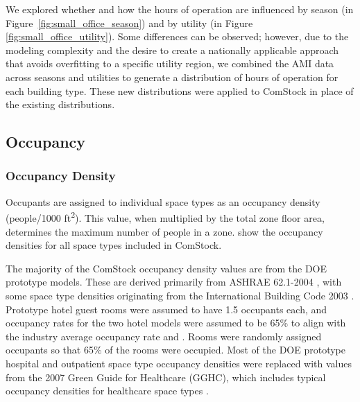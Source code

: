 We explored whether and how the hours of operation are influenced by season (in Figure~\ref{fig:small_office_season}) and by utility (in Figure \ref{fig:small_office_utility}). Some differences can be observed; however, due to the modeling complexity and the desire to create a nationally applicable approach that avoids overfitting to a specific utility region, we combined the AMI data across seasons and utilities to generate a distribution of hours of operation for each building type. These new distributions were applied to ComStock in place of the existing distributions.


\subsection{Occupancy}
\subsubsection{Occupancy Density}
Occupants are assigned to individual space types as an occupancy density (people/1000 ft\textsuperscript{2}). This value, when multiplied by the total zone floor area, determines the maximum number of people in a zone.   show the occupancy densities for all space types included in ComStock.

The majority of the ComStock occupancy density values are from the DOE prototype models. These are derived primarily from ASHRAE 62.1-2004 \citep{ashrae_62.1_2004}, with some space type densities originating from the International Building Code 2003 \citep{icc_2003}. Prototype hotel guest rooms were assumed to have 1.5 occupants each, and occupancy rates for the two hotel models were assumed to be 65\% to align with the industry average occupancy rate and \cite{jiang_2008}. Rooms were randomly assigned occupants so that 65\% of the rooms were occupied. Most of the DOE prototype hospital and outpatient space type occupancy densities were replaced with values from the 2007 Green Guide for Healthcare (GGHC), which includes typical occupancy densities for healthcare space types \citep{gghc_2007}.

